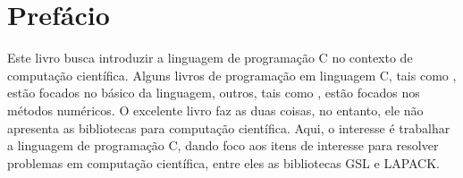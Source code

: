 
\chapter*{Prefácio}

Este livro busca introduzir a linguagem de programação C no contexto de computação científica. Alguns livros de programação em linguagem C, tais como \cite{KERNIGHAM,SENNE,DAMAS,SCHILDT}, estão focados no básico da linguagem, outros, tais como \cite{CALSCI,BURDEN}, estão focados nos métodos numéricos. O excelente livro \cite{PRESSC} faz as duas coisas, no entanto, ele não apresenta as bibliotecas para computação científica. Aqui, o interesse é trabalhar a linguagem de programação C, dando foco aos itens de interesse para resolver problemas em computação científica, entre eles as bibliotecas GSL e LAPACK.